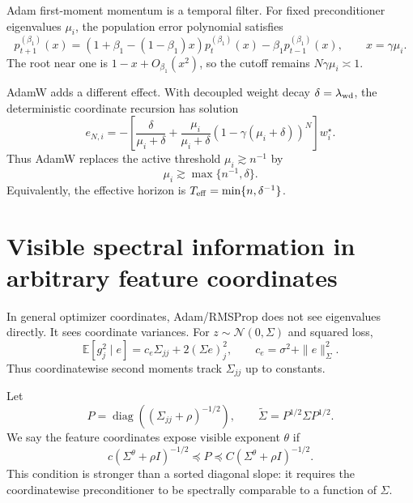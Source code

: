 \documentclass[11pt]{article}
\newcommand{\E}{\mathbb{E}}
\newcommand{\diag}{\operatorname{diag}}
\begin{document}
Adam first-moment momentum is a temporal filter.  For fixed preconditioner eigenvalues $\mu_i$, the population error polynomial satisfies
\begin{equation}
    p_{t+1}^{(\beta_1)}(x)
    =
    (1+\beta_1-(1-\beta_1)x)p_t^{(\beta_1)}(x)-\beta_1p_{t-1}^{(\beta_1)}(x),\qquad x=\gamma\mu_i.
\end{equation}
The root near one is $1-x+O_{\beta_1}(x^2)$, so the cutoff remains $N\gamma\mu_i\asymp1$.

AdamW adds a different effect.  With decoupled weight decay $\delta=\lambda_{\rm wd}$, the deterministic coordinate recursion has solution
\begin{equation}
    e_{N,i}=-\left[\frac{\delta}{\mu_i+\delta}+\frac{\mu_i}{\mu_i+\delta}(1-\gamma(\mu_i+\delta))^N\right]w_i^\star.
\end{equation}
Thus AdamW replaces the active threshold $\mu_i\gtrsim n^{-1}$ by
\begin{equation}
    \mu_i\gtrsim \max\{n^{-1},\delta\}.
\end{equation}
Equivalently, the effective horizon is $T_{\rm eff}=\min\{n,\delta^{-1}\}$.

\section{Visible spectral information in arbitrary feature coordinates}

In general optimizer coordinates, Adam/RMSProp does not see eigenvalues directly.  It sees coordinate variances.  For $z\sim\mathcal N(0,\Sigma)$ and squared loss,
\begin{equation}
    \E[g_j^2\mid e]=c_e\Sigma_{jj}+2(\Sigma e)_j^2,\qquad
    c_e=\sigma^2+\|e\|_\Sigma^2.
\end{equation}
Thus coordinatewise second moments track $\Sigma_{jj}$ up to constants.

Let
\begin{equation}
    P=\diag((\Sigma_{jj}+\rho)^{-1/2}),\qquad
    \tilde\Sigma=P^{1/2}\Sigma P^{1/2}.
\end{equation}
We say the feature coordinates expose visible exponent $\theta$ if
\begin{equation}
\label{eq:visible-comparability}
    c(\Sigma^\theta+\rho I)^{-1/2}\preceq P\preceq C(\Sigma^\theta+\rho I)^{-1/2}.
\end{equation}
This condition is stronger than a sorted diagonal slope: it requires the coordinatewise preconditioner to be spectrally comparable to a function of $\Sigma$.
\end{document}
